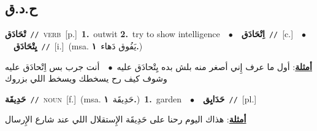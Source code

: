 \documentclass[10pt,a4paper,twoside]{article} %
\begin{document}
\begin{multicols}{2}
\vspace{-3mm}
\subsection*{\color{blue}\foreignlanguage{arabic}{ح.د.ق}\color{blue}{}} 

{\setlength\topsep{0pt}\textbf{\foreignlanguage{arabic}{تْحَادَق}}\ {\color{gray}\texttt{//}\color{black}}\ \textsc{verb}\ [p.]\ \textbf{1.}~outwit  \textbf{2.}~try to show intelligence\ \ $\bullet$\ \ \setlength\topsep{0pt}\textbf{\foreignlanguage{arabic}{اِتْحَادَق}}\ {\color{gray}\texttt{//}\color{black}}\ [c.]\ \ $\bullet$\ \ \setlength\topsep{0pt}\textbf{\foreignlanguage{arabic}{يِتْحَادَق}}\ {\color{gray}\texttt{//}\color{black}}\ [i.]\ \color{gray}(msa. \foreignlanguage{arabic}{يَفُوق دَهاء}~\foreignlanguage{arabic}{\textbf{١.}})\color{black}\  \begin{flushright}\color{gray}\foreignlanguage{arabic}{\textbf{\underline{\foreignlanguage{arabic}{أمثلة}}}: أول ما عرف إِني أصغر منه بلش بده يِتْحادَق عليه\ $\bullet$\ \  أنت جرب بس اِتْحادَق عليه وشوف كيف رح يسخطك ويسخط اللي بزروك}\end{flushright}\color{black}} \vspace{2mm}

{\setlength\topsep{0pt}\textbf{\foreignlanguage{arabic}{حَدِيقَة}}\ {\color{gray}\texttt{//}\color{black}}\ \textsc{noun}\ [f.]\ \color{gray}(msa. \foreignlanguage{arabic}{حَدِيقَة}~\foreignlanguage{arabic}{\textbf{١.}})\color{black}\ \textbf{1.}~garden\ \ $\bullet$\ \ \setlength\topsep{0pt}\textbf{\foreignlanguage{arabic}{حَدَايِق}}\ {\color{gray}\texttt{//}\color{black}}\ [pl.]\  \begin{flushright}\color{gray}\foreignlanguage{arabic}{\textbf{\underline{\foreignlanguage{arabic}{أمثلة}}}: هذاك اليوم رحنا على حَدِيقَة الإِستقلال اللي عند شارع الإِرسال}\end{flushright}\color{black}} \vspace{2mm}


\end{multicols}
\end{document}
